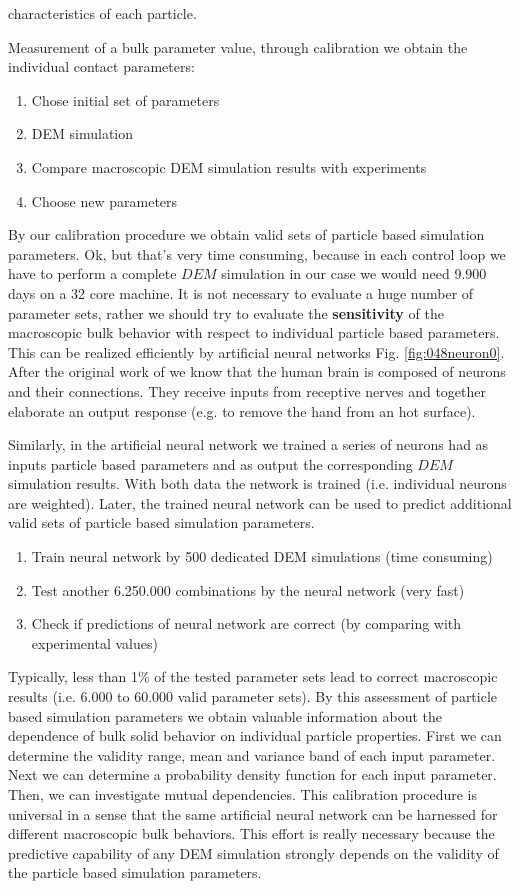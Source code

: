 characteristics of each particle.

Measurement of a bulk parameter value, through calibration we obtain the
individual contact parameters:
\begin{enumerate}
\item{Chose initial set of parameters}
\item{DEM simulation}
\item{Compare macroscopic DEM simulation results with experiments}
\item{Choose new parameters}
\end{enumerate}
By our calibration procedure we obtain valid sets of particle based simulation parameters.
Ok, but that's very time consuming, because in each control loop we have to
perform a complete $DEM$ simulation in our case we would need 9.900 days on a 32
core machine. It is not necessary to evaluate a huge number of parameter sets,
rather we should try to evaluate the \textbf{sensitivity} 
of the macroscopic bulk behavior with respect to individual particle based parameters.
This can be realized efficiently by artificial neural networks Fig.
\ref{fig:048neuron0}. 
After the original work of \citet{RefWorks:189} we know that the human brain is
composed of neurons and their connections. They receive inputs from receptive
nerves and together elaborate an output response (e.g. to remove the hand from
an hot surface).

Similarly, in the artificial neural network we trained a series of neurons had
as inputs particle based parameters and as output the corresponding $DEM$
simulation results.
With both data the network is trained (i.e. individual neurons are
weighted).
Later, the trained neural network can be used to predict additional valid sets of particle based simulation parameters. 

\begin{enumerate}
\item{Train neural network by 500 dedicated DEM simulations (time consuming)}
\item{Test another 6.250.000 combinations by the neural network (very fast)}
\item{Check if predictions of neural network are correct (by comparing with experimental  values)}
\end{enumerate}

Typically, less than 1\% of the tested parameter sets lead to correct
macroscopic results (i.e. 6.000 to 60.000 valid parameter sets).
By this assessment of particle based simulation parameters we obtain valuable information about the dependence 
of bulk solid behavior on individual particle properties.
First we can determine the validity range, mean and variance band of each input
parameter. Next we can determine a probability density function for each input
parameter. Then, we can investigate mutual dependencies.
This calibration procedure is universal in a sense that the same artificial neural network can be harnessed for 
different macroscopic bulk behaviors.
This effort is really necessary because the predictive capability of any DEM simulation strongly 
depends on the validity of the particle 
based simulation parameters.
